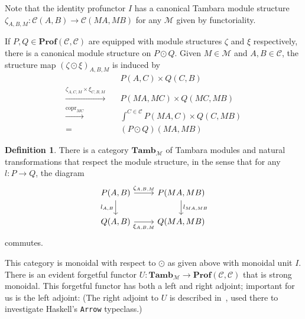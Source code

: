 \documentclass[11pt,letterpaper]{article}
\theoremstyle{plain}
\theoremstyle{definition}
\newtheorem{definition}[theorem]{Definition}
\newcommand{\C}{\mathscr{C}}
\newcommand{\M}{\mathscr{M}}
\newcommand{\Prof}{\mathbf{Prof}}
\newcommand{\Tamb}{\mathbf{Tamb}}
\DeclareMathOperator{\copr}{copr}
\begin{document}
Note that the identity profunctor $I$ has a canonical Tambara module structure $\zeta_{A, B, M} : \C(A, B) \to \C(MA, MB)$ for any $\M$ given by functoriality.

If $P, Q \in \Prof(\C, \C)$ are equipped with module structures $\zeta$ and $\xi$ respectively, there is a canonical module structure on $P \odot Q$. Given $M \in \M$ and $A,B \in \C$, the structure map ${(\zeta \odot \xi)}_{A,B,M}$ is induced by
\begin{align*}
  &P(A,C) \times Q(C,B)  \\
  \xrightarrow{\zeta_{A,C,M} \times \xi_{C,B,M}} \quad& P(MA, MC) \times Q(MC, MB) \\
  \xrightarrow{\copr_{MC}} \quad&\int^{C \in \C} P(MA, C) \times Q(C, MB) \\
  = \quad&(P \odot Q)(MA, MB)
\end{align*}

\begin{definition}
  There is a category $\Tamb_\M$ of Tambara modules and natural transformations that respect the module structure, in the sense that for any $l : P \to Q$, the diagram
  \[
    \begin{tikzcd}
      P(A,B) \ar[r, "\zeta_{A,B,M}"] \ar[d, "l_{A,B}" left] & P(MA, MB) \ar[d, "l_{MA, MB}" right] \\
      Q(A,B) \ar[r, "\xi_{A,B,M}" swap] & Q(MA, MB)
    \end{tikzcd}
  \]
  commutes.
\end{definition}

This category is monoidal with respect to $\odot$ as given above with monoidal unit $I$. There is an evident forgetful functor $U : \Tamb_\M \to \Prof(\C, \C)$ that is strong monoidal. This forgetful functor has both a left and right adjoint; important for us is the left adjoint: (The right adjoint to $U$ is described in~\cite{NotionsOfComputationAsMonoids}, used there to investigate Haskell's \texttt{Arrow} typeclass.)
\end{document}
